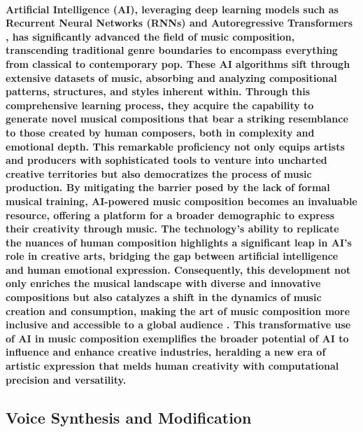 \documentclass[11pt,a4paper,oneside]{report}
\begin{document}
\paragraph{Artificial Intelligence (AI), leveraging deep learning models such as Recurrent Neural Networks (RNNs) \cite{srivastava2015unsupervised} \cite{chiappa2017recurrent} \cite{ha2018world} and Autoregressive Transformers \cite{yan2021videogpt} \cite{wu2022nuwa}, has significantly advanced the field of music composition, transcending traditional genre boundaries to encompass everything from classical to contemporary pop. These AI algorithms sift through extensive datasets of music, absorbing and analyzing compositional patterns, structures, and styles inherent within. Through this comprehensive learning process, they acquire the capability to generate novel musical compositions that bear a striking resemblance to those created by human composers, both in complexity and emotional depth. This remarkable proficiency not only equips artists and producers with sophisticated tools to venture into uncharted creative territories but also democratizes the process of music production. By mitigating the barrier posed by the lack of formal musical training, AI-powered music composition becomes an invaluable resource, offering a platform for a broader demographic to express their creativity through music. The technology's ability to replicate the nuances of human composition highlights a significant leap in AI's role in creative arts, bridging the gap between artificial intelligence and human emotional expression. Consequently, this development not only enriches the musical landscape with diverse and innovative compositions but also catalyzes a shift in the dynamics of music creation and consumption, making the art of music composition more inclusive and accessible to a global audience \cite{briot2021artificial}. This transformative use of AI in music composition exemplifies the broader potential of AI to influence and enhance creative industries, heralding a new era of artistic expression that melds human creativity with computational precision and versatility.}

\subsection{Voice Synthesis and Modification}
\end{document}
